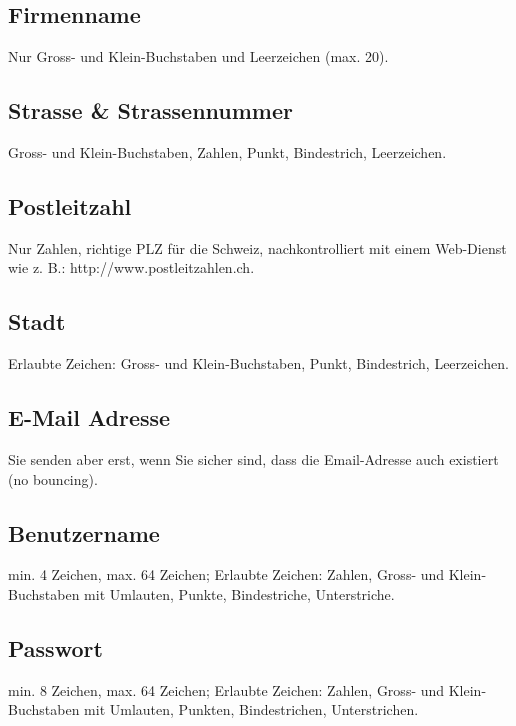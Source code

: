 \documentclass[12pt]{scrartcl}
\begin{document}
\subsection{Firmenname}
Nur Gross- und Klein-Buchstaben und Leerzeichen (max. 20).


\subsection{Strasse \& Strassennummer}
Gross- und Klein-Buchstaben, Zahlen, Punkt, Bindestrich, Leerzeichen.


\subsection{Postleitzahl}
Nur Zahlen, richtige PLZ für die Schweiz, nachkontrolliert mit einem Web-Dienst wie z. B.: http://www.postleitzahlen.ch.


\subsection{Stadt}
Erlaubte Zeichen: Gross- und Klein-Buchstaben, Punkt, Bindestrich, Leerzeichen.


\subsection{E-Mail Adresse}
Sie senden aber erst, wenn Sie sicher sind, dass die
Email-Adresse auch existiert (no bouncing).


\subsection{Benutzername}
min. 4 Zeichen, max. 64 Zeichen; Erlaubte Zeichen:
Zahlen, Gross- und Klein-Buchstaben mit Umlauten, Punkte, Bindestriche, Unterstriche.

\subsection{Passwort}
min. 8 Zeichen, max. 64 Zeichen; Erlaubte Zeichen: Zahlen, Gross- und Klein-Buchstaben mit Umlauten, Punkten, Bindestrichen, Unterstrichen.

\end{document}
